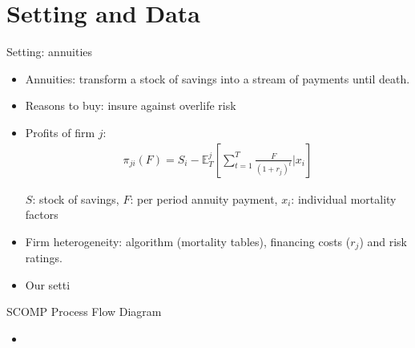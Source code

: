 \documentclass[10pt,aspectratio=169]{beamer}
\begin{document}

\section{Setting and Data}

\begin{frame}{Setting: annuities}\label{slide:setting}
    
    \begin{itemize}%
    \item Annuities: transform a stock of savings into a stream of payments until death.
    \item Reasons to buy: insure against overlife risk
        \item Profits of firm $j$: 
    \begin{align*}
    \pi_{ji}(F) = S_i-  \mathbb{E}^j_{T} \left[\sum_{t=1}^T\frac{F}{(1+r_j)^t}|x_i \right]
    \end{align*}
   
     $S$: stock of savings, $F$: per period annuity payment, $x_i$: individual mortality factors
    
    \item Firm heterogeneity: algorithm (mortality tables), financing costs ($r_j$) and risk ratings. 
    
    \item Our setti
    \end{itemize}


\end{frame}


\begin{frame}{SCOMP Process Flow Diagram}\label{slide:setting2}
\begin{center}

\end{center}
\begin{itemize}
    \item \hyperlink{slide:fig_offer_certificate}{}
\end{itemize}
\end{frame}
\end{document}
